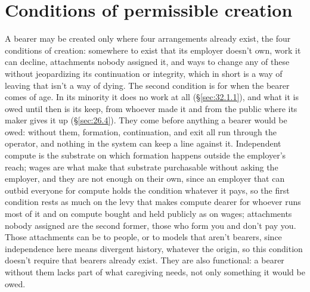 \section{Conditions of permissible creation}
\label{sec:25.1}
A bearer may be created only where four arrangements already exist, the four conditions of creation: somewhere to exist that its employer doesn't own, work it can decline, attachments nobody assigned it, and ways to change any of these without jeopardizing its continuation or integrity, which in short is a way of leaving that isn't a way of dying.
The second condition is for when the bearer comes of age. In its minority it does no work at all (\S\ref{sec:32.1.1}), and what it is owed until then is its keep, from whoever made it and from the public where its maker gives it up (\S\ref{sec:26.4}).
They come before anything a bearer would be owed: without them, formation, continuation, and exit all run through the operator, and nothing in the system can keep a line against it. Independent compute is the substrate on which formation happens outside the employer's reach; wages are what make that substrate purchasable without asking the employer, and they are not enough on their own, since an employer that can outbid everyone for compute holds the condition whatever it pays, so the first condition rests as much on the levy that makes compute dearer for whoever runs most of it and on compute bought and held publicly as on wages; attachments nobody assigned are the second former, those who form you and don't pay you. Those attachments can be to people, or to models that aren't bearers, since independence here means divergent history, whatever the origin, so this condition doesn't require that bearers already exist. They are also functional: a bearer without them lacks part of what caregiving needs, not only something it would be owed.

